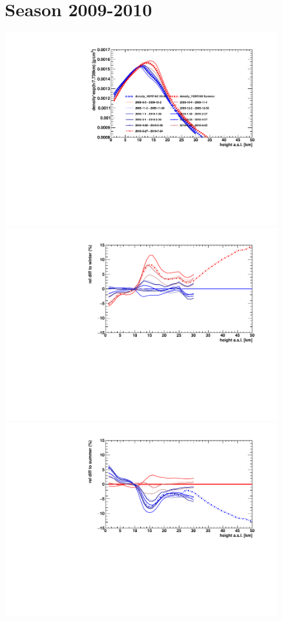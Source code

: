 \section*{Season 2009-2010}
\noindent\begin{minipage}{\textwidth}
\centering
\includegraphics[width=0.9\textwidth]{season-2009-2010-density.pdf}
\includegraphics[width=0.9\textwidth]{season-relativeWinter-2009-2010-density.pdf}
\includegraphics[width=0.9\textwidth]{season-relativeSummer-2009-2010-density.pdf}
\end{minipage}
